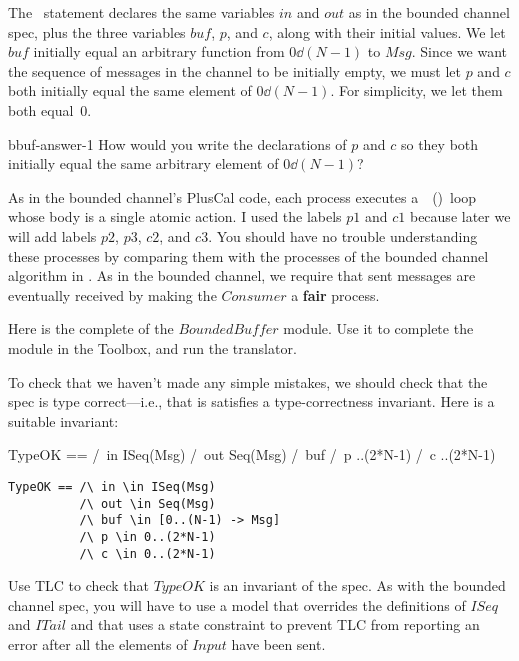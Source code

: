 \documentclass[fleqn,leqno]{article}
\begin{document}
The \variables\ statement declares the same variables $in$ and $out$
as in the bounded channel spec, plus the three variables $buf$, $p$, and $c$,
along with their initial values.  We let $buf$ initially equal an
arbitrary function from $0\dd(N-1)$ to $Msg$.  Since we want the
sequence of messages in the channel to be initially empty, we must let
$p$ and $c$ both initially equal the same element of $0\dd(N-1)$.  For
simplicity, we let them both equal~$0$.
%
\begin{aquestion}{bbuf-answer-1}
How would you write the declarations of $p$ and $c$ so they
both initially equal the same arbitrary element of $0\dd(N-1)$?
\end{aquestion}
As in the bounded channel's PlusCal code, each
process executes a \,\pwhile~(\TRUE)\, loop whose body is a single atomic
action.  I used the labels $p1$ and $c1$ because later we will add labels $p2$,
$p3$, $c2$, and $c3$.
You should have no trouble understanding these processes by comparing
them with the processes of the bounded channel algorithm in
 .
As in the bounded channel, we require that sent messages are
eventually received by making the $Consumer$ a \textbf{fair} process.

Here is the complete  of the $BoundedBuffer$ module.  Use it to complete the module
in the Toolbox, and run the translator.

To check that we haven't made any simple mistakes, we should check
that the spec is type correct---i.e., that is satisfies a
type-correctness invariant.  Here is a suitable invariant:
\begin{twocols}
\begin{notla}
TypeOK == /\ in  \in ISeq(Msg)
          /\ out \in Seq(Msg)
          /\ buf \in [0..(N-1) -> Msg]
          /\ p ..(2*N-1)
          /\ c ..(2*N-1)
\end{notla}
\begin{tlatex}
%
%
%
\end{tlatex}
\midcol
\begin{verbatim}
TypeOK == /\ in \in ISeq(Msg)
          /\ out \in Seq(Msg)
          /\ buf \in [0..(N-1) -> Msg]
          /\ p \in 0..(2*N-1)
          /\ c \in 0..(2*N-1)
\end{verbatim}
\end{twocols}
Use TLC to check that $TypeOK$ is an invariant of the spec.  As with
the bounded channel spec, you will have to use a model that overrides
the definitions of $ISeq$ and $ITail$ and that uses a state constraint
to prevent TLC from reporting an error after all the elements of
$Input$ have been sent.
\end{document}
